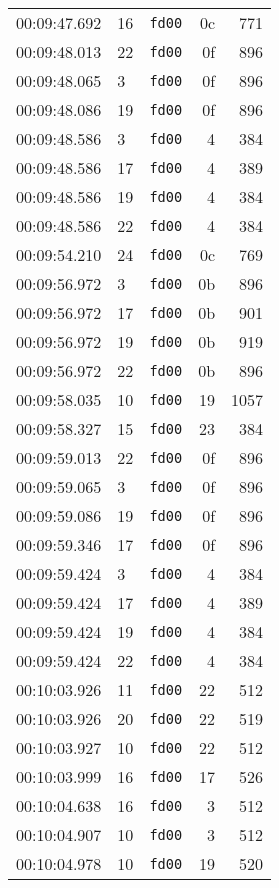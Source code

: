 \documentclass{article}
\begin{document}
\begin{longtable}{lllrr}
00:09:47.692 & 16 & \texttt{fd00} & 0c & 771 \\
00:09:48.013 & 22 & \texttt{fd00} & 0f & 896 \\
00:09:48.065 & 3 & \texttt{fd00} & 0f & 896 \\
00:09:48.086 & 19 & \texttt{fd00} & 0f & 896 \\
00:09:48.586 & 3 & \texttt{fd00} & 4 & 384 \\
00:09:48.586 & 17 & \texttt{fd00} & 4 & 389 \\
00:09:48.586 & 19 & \texttt{fd00} & 4 & 384 \\
00:09:48.586 & 22 & \texttt{fd00} & 4 & 384 \\
00:09:54.210 & 24 & \texttt{fd00} & 0c & 769 \\
00:09:56.972 & 3 & \texttt{fd00} & 0b & 896 \\
00:09:56.972 & 17 & \texttt{fd00} & 0b & 901 \\
00:09:56.972 & 19 & \texttt{fd00} & 0b & 919 \\
00:09:56.972 & 22 & \texttt{fd00} & 0b & 896 \\
00:09:58.035 & 10 & \texttt{fd00} & 19 & 1057 \\
00:09:58.327 & 15 & \texttt{fd00} & 23 & 384 \\
00:09:59.013 & 22 & \texttt{fd00} & 0f & 896 \\
00:09:59.065 & 3 & \texttt{fd00} & 0f & 896 \\
00:09:59.086 & 19 & \texttt{fd00} & 0f & 896 \\
00:09:59.346 & 17 & \texttt{fd00} & 0f & 896 \\
00:09:59.424 & 3 & \texttt{fd00} & 4 & 384 \\
00:09:59.424 & 17 & \texttt{fd00} & 4 & 389 \\
00:09:59.424 & 19 & \texttt{fd00} & 4 & 384 \\
00:09:59.424 & 22 & \texttt{fd00} & 4 & 384 \\
00:10:03.926 & 11 & \texttt{fd00} & 22 & 512 \\
00:10:03.926 & 20 & \texttt{fd00} & 22 & 519 \\
00:10:03.927 & 10 & \texttt{fd00} & 22 & 512 \\
00:10:03.999 & 16 & \texttt{fd00} & 17 & 526 \\
00:10:04.638 & 16 & \texttt{fd00} & 3 & 512 \\
00:10:04.907 & 10 & \texttt{fd00} & 3 & 512 \\
00:10:04.978 & 10 & \texttt{fd00} & 19 & 520 \\

\end{longtable}
\end{document}
